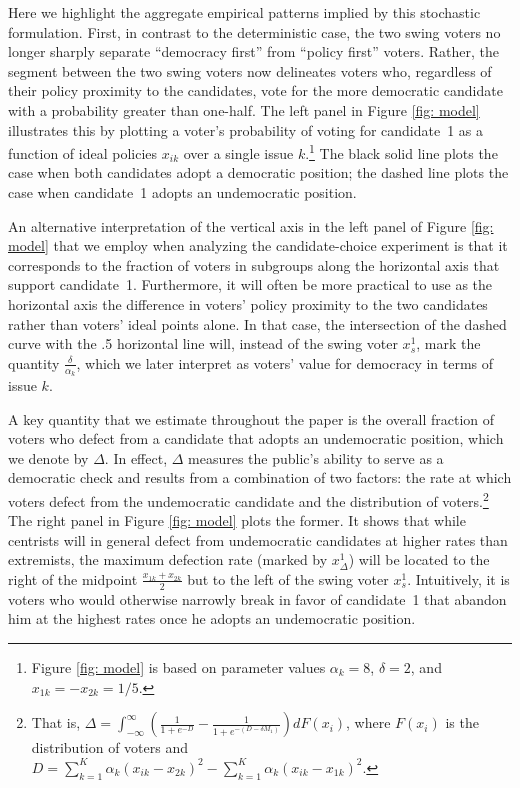 \documentclass[letterpaper, 12pt]{article}
\begin{document}
\begin{raggedright}
Here we highlight the aggregate empirical patterns implied by this stochastic formulation. First, in contrast to the deterministic case, the two swing voters no longer sharply separate ``democracy first'' from ``policy first'' voters. Rather, the segment between the two swing voters now delineates voters who, regardless of their policy proximity to the candidates, vote for the more democratic candidate with a probability greater than one-half. The left panel in Figure \ref{fig: model} illustrates this by plotting a voter's probability of voting for candidate~1 as a function of ideal policies $x_{ik}$ over a single issue $k$.\footnote{Figure \ref{fig: model} is based on parameter values $\alpha_k=8$, $\delta=2$, and $x_{1k}=- x_{2k}=1/5$.} The black solid line plots the case when both candidates adopt a democratic position; the dashed line plots the case when candidate~1 adopts an undemocratic position.

An alternative interpretation of the vertical axis in the left panel of Figure \ref{fig: model} that we employ when analyzing the candidate-choice experiment is that it corresponds to the fraction of voters in subgroups along the horizontal axis that support candidate~1. Furthermore, it will often be more practical to use as the horizontal axis the difference in voters' policy proximity to the two candidates rather than voters' ideal points alone. In that case, the intersection of the dashed curve with the .5 horizontal line will, instead of the swing voter $x_{s}^1$, mark the quantity $\frac{\delta}{\alpha_k}$, which we later interpret as voters' value for democracy in terms of issue $k$.


A key quantity that we estimate throughout the paper is the overall fraction of voters who defect from a candidate that adopts an undemocratic position, which we denote by $\Delta$. In effect, $\Delta$ measures the public's ability to serve as a democratic check and results from a combination of two factors: the rate at which voters defect from the undemocratic candidate and the distribution of voters.\footnote{That is, $\Delta = \int_{-\infty}^{\infty} \left(\frac{1}{1+e^{-D}}-\frac{1}{1+e^{-(D - \delta M_1)}}\right) dF(x_i)$, where $F(x_i)$ is the distribution of voters and $D=\sum\limits_{k=1}^K \alpha_k (x_{ik} - x_{2k})^2-\sum\limits_{k=1}^K \alpha_k (x_{ik} - x_{1k})^2$.} The right panel in Figure \ref{fig: model} plots the former. It shows that while centrists will in general defect from undemocratic candidates at higher rates than extremists, the maximum defection rate (marked by $x^1_{\Delta}$) will be located to the right of the midpoint $\frac{x_{1k} + x_{2k}}{2}$ but to the left of the swing voter $x_{s}^1$. Intuitively, it is voters who would otherwise narrowly break in favor of candidate~1 that abandon him at the highest rates once he adopts an undemocratic position.


\end{raggedright}
\end{document}
